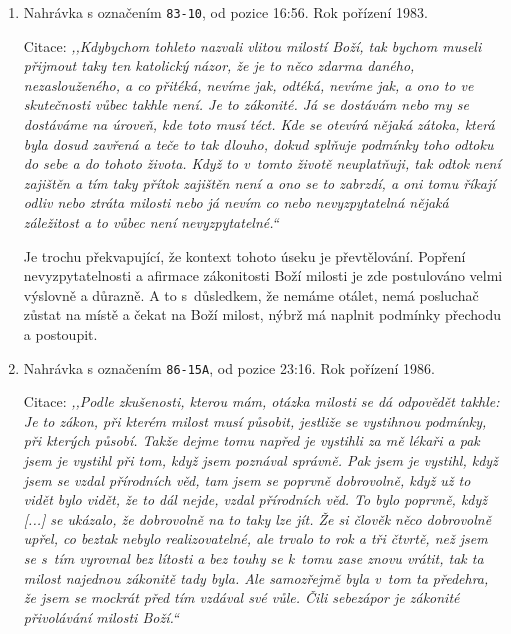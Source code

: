 \begin{enumerate}
{    Variace na předchozí výroky, kde se milost Boží podmiňuje zákonitostí.
    V~tomto případě se hovoří o svolení ze strany člověka.
  }
  \item{
    Nahrávka s označením \texttt{83-10}, od pozice 16:56.
    Rok pořízení 1983.

    Citace: \textit{%
      ,,Kdybychom tohleto nazvali vlitou milostí Boží, tak bychom museli přijmout
      taky ten katolický názor, že je to něco zdarma daného, nezaslouženého, a
      co přitéká, nevíme jak, odtéká, nevíme jak, a ono to ve skutečnosti vůbec
      takhle není. Je to zákonité. Já se dostávám nebo my se dostáváme na
      úroveň, kde toto musí téct. Kde se otevírá nějaká zátoka, která byla dosud
      zavřená a teče to tak dlouho, dokud splňuje podmínky toho odtoku do sebe a
      do tohoto života. Když to v~tomto životě neuplatňuji, tak odtok není
      zajištěn a tím taky přítok zajištěn není a ono se to zabrzdí, a oni tomu
      říkají odliv nebo ztráta milosti nebo já nevím co nebo nevyzpytatelná
      nějaká záležitost a to vůbec není nevyzpytatelné.``
    }

    Je trochu překvapující, že kontext tohoto úseku je převtělování. Popření
    nevyzpytatelnosti a afirmace zákonitosti Boží milosti je zde postulováno
    velmi výslovně a důrazně. A to s~důsledkem, že nemáme otálet, nemá
    posluchač zůstat na místě a čekat na Boží milost, nýbrž má naplnit podmínky
    přechodu a postoupit.
  }
  \item{
    Nahrávka s označením \texttt{86-15A}, od pozice 23:16.
    Rok pořízení 1986.

    Citace: \textit{%
      ,,Podle zkušenosti, kterou mám, otázka milosti se dá odpovědět takhle: Je to
      zákon, při kterém milost musí působit, jestliže se vystihnou podmínky, při
      kterých působí. Takže dejme tomu napřed je vystihli za mě lékaři a pak
      jsem je vystihl při tom, když jsem poznával správně. Pak jsem je vystihl,
      když jsem se vzdal přírodních věd, tam jsem se poprvně dobrovolně, když už
      to vidět bylo vidět, že to dál nejde, vzdal přírodních věd. To bylo
      poprvně, když [...] se ukázalo, že dobrovolně na to taky lze jít. Že si
      člověk něco dobrovolně upřel, co beztak nebylo realizovatelné, ale trvalo
      to rok a tři čtvrtě, než jsem se s~tím vyrovnal bez lítosti a bez touhy se
      k~tomu zase znovu vrátit, tak ta milost najednou zákonitě tady byla. Ale
      samozřejmě byla v~tom ta předehra, že jsem se mockrát před tím vzdával své
      vůle. Čili sebezápor je zákonité přivolávání milosti Boží.``
    }

}
\end{enumerate}
